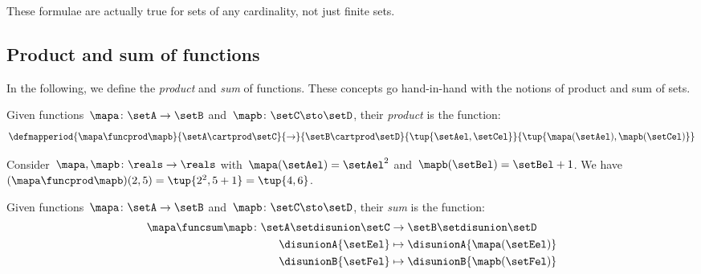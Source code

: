 These formulae are actually true for sets of any cardinality, not just finite sets.

\subsection{Product and sum of functions}
\label{sec:prod_dirsum_functions}

In the following, we define the \emph{product} and \emph{sum} of functions.
These concepts go hand-in-hand with the notions of product and sum of sets.

\begin{ctdefinition}
    \label{def:prod_functions}
    Given functions~$\mapa\colon \setA\to \setB$ and~$\mapb\colon \setC \sto \setD$, their \emph{product} is the function:
    \begin{equation}
        \defmapperiod{
            \mapa \funcprod \mapb
        }{
            \setA \cartprod \setC
        }{
            \to
        }{
            \setB\cartprod \setD
        }{
            \tup{\setAel, \setCel}
        }{
            \tup{\mapa(\setAel),\mapb(\setCel)}
        }
    \end{equation}
\end{ctdefinition}

\begin{example}
    Consider~$\mapa,\mapb \colon \reals \to \reals$ with~$\mapa(\setAel)=\setAel^2$ and~$\mapb(\setBel)=\setBel+1$.
    We have~$(\mapa \funcprod \mapb)(2,5)=\tup{2^2,5+1}=\tup{4,6}$.
\end{example}

\begin{ctdefinition}
    \label{def:dirsum_functions}
    Given functions~$\mapa\colon \setA\to \setB$ and~$\mapb\colon \setC \sto \setD$, their \emph{sum} is the function:
    \begin{equation}
        \begin{aligned}
            \mapa \funcsum \mapb \colon \setA \setdisunion \setC & \to \setB\setdisunion \setD \\
            \disunionA{\setEel}                                  & \mapsto \disunionA{\mapa(\setEel)} \\
            \disunionB{\setFel}                                  & \mapsto \disunionB{\mapb(\setFel)} \\
        \end{aligned}
    \end{equation}
\end{ctdefinition}

